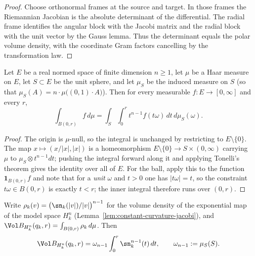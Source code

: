 \begin{proof}
\sketch
\leanok
{}
Choose orthonormal frames at the source and target. In those frames the Riemannian Jacobian is the absolute determinant of the differential. The radial frame identifies the angular block with the Jacobi matrix and the radial block with the unit vector by the Gauss lemma. Thus the determinant equals the polar volume density, with the coordinate Gram factors cancelling by the transformation law.
\end{proof}


\begin{lemma}
\label{lem:polar-coordinates}
\leanok


Let $E$ be a real normed space of finite dimension $n\ge1$, let $\mu$ be a Haar
measure on $E$, let $S\subset E$ be the unit sphere, and let $\mu_S$ be the
induced measure on $S$ (so that $\mu_S(A)=n\cdot\mu\bigl((0,1)\cdot A\bigr)$).
Then for every measurable $f\colon E\to[0,\infty]$ and every $r$,
$$\int_{B(0,r)}f\,d\mu
=\int_{S}\int_0^r t^{n-1}f(t\omega)\,dt\,d\mu_S(\omega).$$
\end{lemma}

\begin{proof}
\sketch
\leanok
The origin is $\mu$-null, so the integral is unchanged by restricting to
$E\setminus\{0\}$. The map $x\mapsto(x/|x|,|x|)$ is a homeomorphism
$E\setminus\{0\}\to S\times(0,\infty)$ carrying $\mu$ to
$\mu_S\otimes t^{n-1}dt$; pushing the integral forward along it and applying
Tonelli's theorem gives the identity over all of $E$. For the ball, apply this
to the function $\mathbf 1_{B(0,r)}f$ and note that for a \emph{unit} $\omega$ and
$t>0$ one has $|t\omega|=t$, so the constraint $t\omega\in B(0,r)$ is exactly
$t<r$; the inner integral therefore runs over $(0,r)$.
\end{proof}

\begin{lemma}
\label{lem:model-ball-volume}
\leanok



Write $\rho_k(v)=\bigl(\sn_k(|v|)/|v|\bigr)^{n-1}$ for the volume density of the
exponential map of the model space $H^n_k$ (Lemma~\ref{lem:constant-curvature-jacobi}),
and $\Vol B_{H^n_k}(q_k,r)=\int_{B(0,r)}\rho_k\,d\mu$. Then
$$\Vol B_{H^n_k}(q_k,r)=\omega_{n-1}\int_0^r\sn_k^{n-1}(t)\,dt,
\qquad \omega_{n-1}:=\mu_S(S).$$
\end{lemma}


